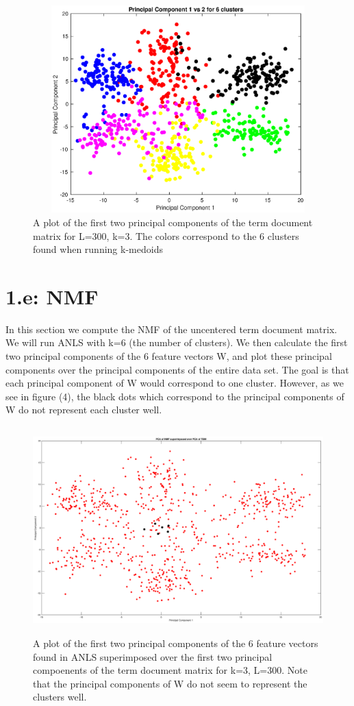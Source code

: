 \documentclass{article}
\begin{document}
\begin{figure}[H]
    \centerline
    {
    \includegraphics[width=17.5cm, height=8cm]{d_clusters}
    }
    \caption{\label{fig:my figure} A plot of the first two principal components of the term document matrix for L=300, k=3.  The colors correspond to the 6 clusters found when running k-medoids}
\end{figure}


\section*{1.e: NMF}
In this section we compute the NMF of the uncentered term document matrix. We will run ANLS with k=6 (the number of clusters).  We then calculate the first two principal components of the 6 feature vectors W, and plot these principal components over the principal components of the entire data set.  The goal is that each principal component of W would correspond to one cluster.  However, as we see in figure (4), the black dots which correspond to the principal components of W do not represent each cluster well.

\begin{figure}[H]
    \centerline
    {
    \includegraphics[width=17.5cm, height=8cm]{e_no_lines}
    }
    \caption{\label{fig:my figure} A plot of the first two principal components of the 6 feature vectors found in ANLS superimposed over the first two principal compoenents of the term document matrix for k=3, L=300.  Note that the principal components of W do not seem to represent the clusters well. }
\end{figure}
\end{document}
